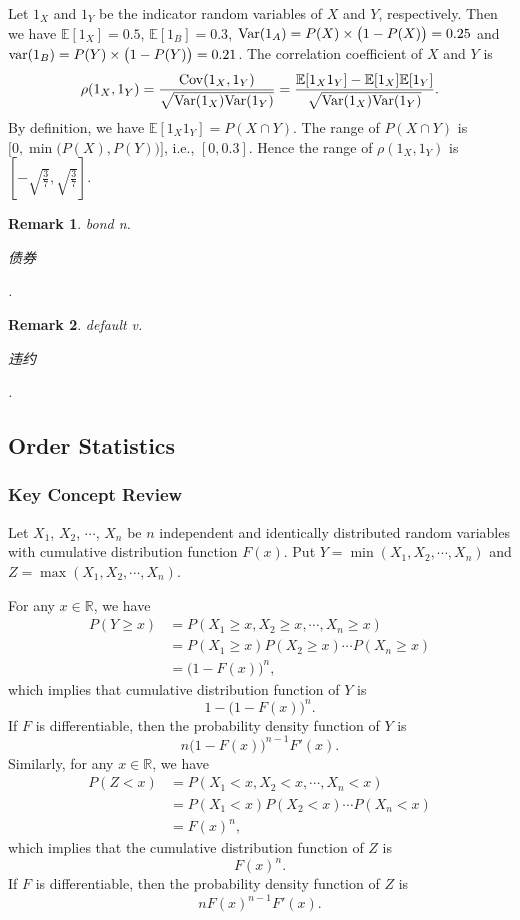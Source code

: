 \documentclass[12pt,letterpaper, onecolumn]{exam}
\newtheorem{remark}{Remark}
\begin{document}
\begin{questions}
\begin{solution}
            \quad Let $1_X$ and $1_Y$ be the indicator random variables of $X$ and $Y$, respectively. Then we have $\mathbb{E}[1_X]=0.5$, $\mathbb{E}[1_B]=0.3$, ${\rm{Var}}(1_A)=P(X)\times\big(1-P(X)\big)=0.25$ and ${\rm{var}}(1_B)=P(Y)\times\big(1-P(Y)\big)=0.21$. The correlation coefficient of $X$ and $Y$ is
            $$\rho(1_X,1_Y)=\frac{{\rm{Cov}}(1_X,1_Y)}{\sqrt{{\rm{Var}}(1_X){\rm{Var}}(1_Y)}}=\frac{\mathbb{E}[1_X1_Y]-\mathbb{E}[1_X]\mathbb{E}[1_Y]}{\sqrt{{\rm{Var}}(1_X){\rm{Var}}(1_Y)}}.$$
            By definition, we have $\mathbb{E}[1_X1_Y]=P(X\cap Y)$. The range of $P(X\cap Y)$ is $\Big[0,\min\big(P(X),P(Y)\big)\Big]$, i.e., $[0,0.3]$. Hence the range of $\rho(1_X,1_Y)$ is $[-\sqrt{\frac{3}{7}},\sqrt{\frac{3}{7}}]$.
        \end{solution}
        \begin{remark}
            bond  n. \begin{CJK}{UTF8}{gbsn}债券\end{CJK}.
        \end{remark}
        \begin{remark}
            default  v. \begin{CJK}{UTF8}{gbsn}违约\end{CJK}.
        \end{remark}
    \end{questions}

    \subsection{Order Statistics}
    \subsubsection{Key Concept Review}

    \quad Let $X_1$, $X_2$, $\cdots$, $X_n$ be $n$ independent and identically distributed random variables with cumulative distribution function $F(x)$. Put $Y=\min(X_1,X_2,\cdots,X_n)$ and $Z=\max(X_1,X_2,\cdots,X_n)$.

    \quad For any $x\in\mathbb{R}$, we have 
    \begin{align*}
        P(Y\ge x)&=P(X_1\ge x,X_2\ge x,\cdots,X_n\ge x)\\
        &=P(X_1\ge x)P(X_2\ge x)\cdots P(X_n\ge x)\\
        &=\big(1-F(x)\big)^n,
    \end{align*}
    which implies that cumulative distribution function of $Y$ is 
    $$1-\big(1-F(x)\big)^n.$$
    If $F$ is differentiable, then the probability density function of $Y$ is
    $$n\big(1-F(x)\big)^{n-1}F'(x).$$
    \quad Similarly, for any $x\in\mathbb{R}$, we have 
    \begin{align*}
        P(Z<x)&=P(X_1<x,X_2<x,\cdots,X_n<x)\\
        &=P(X_1<x)P(X_2<x)\cdots P(X_n<x)\\
        &=F(x)^n,
    \end{align*}
    which implies that the cumulative distribution function of $Z$ is
    $$F(x)^n.$$
    If $F$ is differentiable, then the probability density function of $Z$ is
    $$nF(x)^{n-1}F'(x).$$
\end{document}
